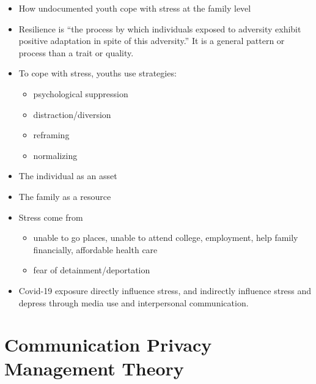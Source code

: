 \documentclass[
]{book}
\providecommand{\tightlist}{%
  \setlength{\itemsep}{0pt}\setlength{\parskip}{0pt}}
\begin{document}
\begin{itemize}
\item
  How undocumented youth cope with stress at the family level
\item
  Resilience is ``the process by which individuals exposed to adversity exhibit positive adaptation in spite of this adversity.'' It is a general pattern or process than a trait or quality.
\item
  To cope with stress, youths use strategies:

  \begin{itemize}
  \item
    psychological suppression
  \item
    distraction/diversion
  \item
    reframing
  \item
    normalizing
  \end{itemize}
\item
  The individual as an asset
\item
  The family as a resource
\item
  Stress come from

  \begin{itemize}
  \item
    unable to go places, unable to attend college, employment, help family financially, affordable health care
  \item
    fear of detainment/deportation
  \end{itemize}
\end{itemize}

\citep{First_2020}

\begin{itemize}
\tightlist
\item
  Covid-19 exposure directly influence stress, and indirectly influence stress and depress through media use and interpersonal communication.
\end{itemize}

\hypertarget{communication-privacy-management-theory}{%
\section{Communication Privacy Management Theory}\label{communication-privacy-management-theory}}
\end{document}

